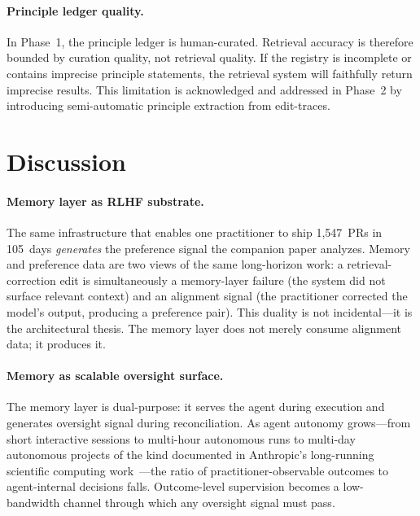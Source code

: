 \documentclass[11pt]{article}
\begin{document}
\paragraph{Principle ledger quality.}
In Phase~1, the principle ledger is human-curated.
Retrieval accuracy is therefore bounded by curation quality, not retrieval quality.
If the registry is incomplete or contains imprecise principle statements, the retrieval system will faithfully return imprecise results.
This limitation is acknowledged and addressed in Phase~2 by introducing semi-automatic principle extraction from edit-traces.


\section{Discussion}
\label{sec:discussion}

\paragraph{Memory layer as RLHF substrate.}
The same infrastructure that enables one practitioner to ship 1{,}547~PRs in 105~days \emph{generates} the preference signal the companion paper analyzes.
Memory and preference data are two views of the same long-horizon work: a retrieval-correction edit is simultaneously a memory-layer failure (the system did not surface relevant context) and an alignment signal (the practitioner corrected the model's output, producing a preference pair).
This duality is not incidental---it is the architectural thesis.
The memory layer does not merely consume alignment data; it produces it.

\paragraph{Memory as scalable oversight surface.}
The memory layer is dual-purpose: it serves the agent during execution and generates oversight signal during reconciliation.
As agent autonomy grows---from short interactive sessions to multi-hour autonomous runs to multi-day autonomous projects of the kind documented in Anthropic's long-running scientific computing work~\citep{anthropic2026longrunning}---the ratio of practitioner-observable outcomes to agent-internal decisions falls.
Outcome-level supervision becomes a low-bandwidth channel through which any oversight signal must pass.
\end{document}
